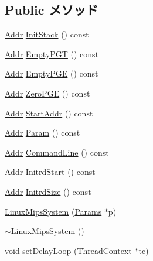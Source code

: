 \subsection*{Public メソッド}
\begin{DoxyCompactItemize}
\item 
\hyperlink{base_2types_8hh_af1bb03d6a4ee096394a6749f0a169232}{Addr} \hyperlink{classLinuxMipsSystem_a469a89bdc63563c0bc5846ef647dcab6}{InitStack} () const 
\item 
\hyperlink{base_2types_8hh_af1bb03d6a4ee096394a6749f0a169232}{Addr} \hyperlink{classLinuxMipsSystem_a2259d56c0c0084560828cefba4f46c0a}{EmptyPGT} () const 
\item 
\hyperlink{base_2types_8hh_af1bb03d6a4ee096394a6749f0a169232}{Addr} \hyperlink{classLinuxMipsSystem_afd9b1bf6ab7fce16a7fb5fbee207c7fb}{EmptyPGE} () const 
\item 
\hyperlink{base_2types_8hh_af1bb03d6a4ee096394a6749f0a169232}{Addr} \hyperlink{classLinuxMipsSystem_a9a4b640fd69f54b236dfe826a83e99ad}{ZeroPGE} () const 
\item 
\hyperlink{base_2types_8hh_af1bb03d6a4ee096394a6749f0a169232}{Addr} \hyperlink{classLinuxMipsSystem_a0cec91dcd0a14397dacd2e083f248ac8}{StartAddr} () const 
\item 
\hyperlink{base_2types_8hh_af1bb03d6a4ee096394a6749f0a169232}{Addr} \hyperlink{classLinuxMipsSystem_a0df930196034a157336cf5c0b8c62619}{Param} () const 
\item 
\hyperlink{base_2types_8hh_af1bb03d6a4ee096394a6749f0a169232}{Addr} \hyperlink{classLinuxMipsSystem_abcf63fc8eb1c5516fa32ca30a8fa11de}{CommandLine} () const 
\item 
\hyperlink{base_2types_8hh_af1bb03d6a4ee096394a6749f0a169232}{Addr} \hyperlink{classLinuxMipsSystem_abca06263004752bd3ae5595b19a0c288}{InitrdStart} () const 
\item 
\hyperlink{base_2types_8hh_af1bb03d6a4ee096394a6749f0a169232}{Addr} \hyperlink{classLinuxMipsSystem_a257cf57c2cc6d9965f9adf8e062d5b74}{InitrdSize} () const 
\item 
\hyperlink{classLinuxMipsSystem_a27aa28fc4cff867ee820c243a8d8abf2}{LinuxMipsSystem} (\hyperlink{classLinuxMipsSystem_a3d1083cbefc15728ca643470f9efbf13}{Params} $\ast$p)
\item 
\hyperlink{classLinuxMipsSystem_a35954832db55ae1b6c416ab9db42e265}{$\sim$LinuxMipsSystem} ()
\item 
void \hyperlink{classLinuxMipsSystem_a137cc9484ecf0bcc374fb7031b48d566}{setDelayLoop} (\hyperlink{classThreadContext}{ThreadContext} $\ast$tc)
\end{DoxyCompactItemize}
